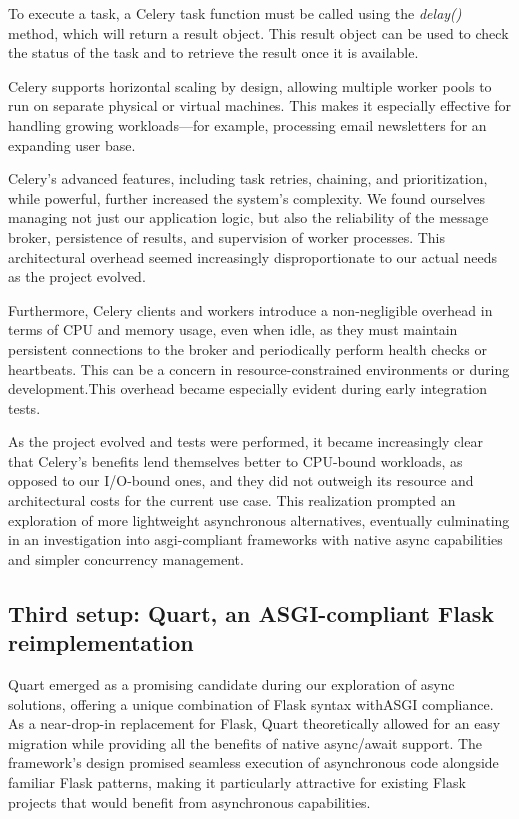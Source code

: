        To execute a task, a Celery task function must be called using the \textit{delay()} method, which will return a result object. 
        This result object can be used to check the status of the task and to retrieve the result once it is available.

        Celery supports horizontal scaling by design, allowing multiple worker pools to run on separate physical or virtual machines. 
        This makes it especially effective for handling growing workloads—for example, processing email newsletters for an expanding 
        user base.

        Celery's advanced features, including task retries, chaining, and prioritization, while powerful, further increased the 
        system's complexity. We found ourselves managing not just our application logic, but also the reliability of the message broker, 
        persistence of results, and supervision of worker processes. This architectural overhead seemed increasingly disproportionate to 
        our actual needs as the project evolved.

        Furthermore, Celery clients and workers introduce a non-negligible overhead in terms of CPU and memory usage, even when 
        idle, as they must maintain persistent connections to the broker and periodically perform health checks or heartbeats. 
        This can be a concern in resource-constrained environments or during development.This overhead became especially evident 
        during early integration tests.

        As the project evolved and tests were performed, it became increasingly clear that Celery's benefits lend themselves better 
        to CPU-bound workloads, as opposed to our I/O-bound ones, and they did not outweigh its resource and architectural costs for 
        the current use case. This realization prompted an exploration of more lightweight asynchronous alternatives, eventually 
        culminating in an investigation into \ac{asgi}-compliant frameworks with native async capabilities and simpler concurrency 
        management.

    \subsection{Third setup: Quart, an ASGI-compliant Flask reimplementation}

        Quart emerged as a promising candidate during our exploration of async solutions, offering a unique combination of 
        Flask syntax with\ac{ASGI} compliance. As a near-drop-in replacement for Flask, Quart theoretically allowed for 
        an easy migration while providing all the benefits of native async/await support. The framework's design promised 
        seamless execution of asynchronous code alongside familiar Flask patterns, making it particularly attractive for 
        existing Flask projects that would benefit from asynchronous capabilities.

